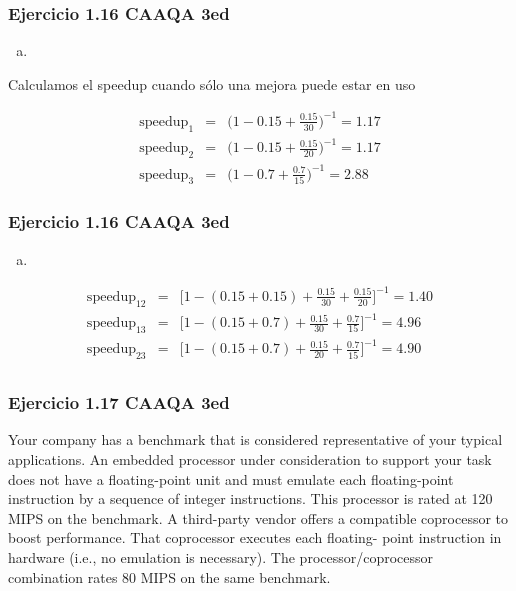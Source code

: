 \documentclass{beamer}
\begin{document}
\begin{frame}
\frametitle{Ejercicio 1.16 CAAQA 3ed}
\begin{enumerate}[c.]
\item
\end{enumerate}
Calculamos el speedup cuando sólo una mejora puede estar en uso

\begin{eqnarray*}
 \text{speedup}_1 &=& \big(1 - 0.15 + \frac{0.15}{30} \big)^{-1} = 1.17 \\
 \text{speedup}_2 &=& \big(1 - 0.15 + \frac{0.15}{20} \big)^{-1} = 1.17 \\
 \text{speedup}_3 &=& \big(1 - 0.7 + \frac{0.7}{15} \big)^{-1} = 2.88
 \end{eqnarray*}

\end{frame}

\begin{frame}
\frametitle{Ejercicio 1.16 CAAQA 3ed}
\begin{enumerate}[c.]
\item
\end{enumerate}

\begin{eqnarray*}
 \text{speedup}_12 &=& \bigg[1 - (0.15 + 0.15) + \frac{0.15}{30} + \frac{0.15}{20} \bigg]^{-1} = 1.40 \\
 \text{speedup}_13 &=& \bigg[1 - (0.15 + 0.7) + \frac{0.15}{30} + \frac{0.7}{15} \bigg]^{-1} = 4.96 \\
 \text{speedup}_23 &=& \bigg[1 - (0.15 + 0.7) + \frac{0.15}{20} + \frac{0.7}{15} \bigg]^{-1} = 4.90 \\
 \end{eqnarray*}

\end{frame}


\begin{frame}
\frametitle{Ejercicio 1.17 CAAQA 3ed}
Your company has a benchmark that is considered representative of your typical applications. An embedded processor under consideration to support your task does not have a floating-point unit and must emulate each floating-point instruction by a sequence of integer instructions. This processor is rated at 120 MIPS on the benchmark. A third-party vendor offers a compatible coprocessor to boost performance. That coprocessor executes each floating- point instruction in hardware (i.e., no emulation is necessary). The processor/coprocessor combination rates 80 MIPS on the same benchmark. 

\end{frame}
\end{document}
